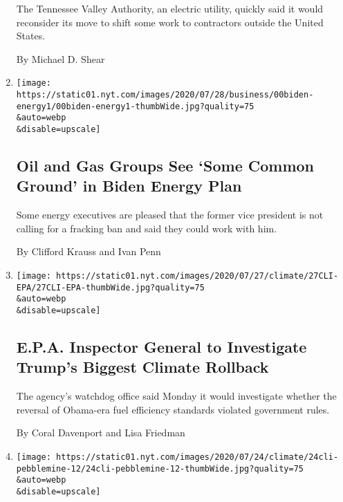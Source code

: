 \begin{enumerate}
  The Tennessee Valley Authority, an electric utility, quickly said it
  would reconsider its move to shift some work to contractors outside
  the United States.

  By Michael D. Shear
\item
  \href{/2020/07/28/business/energy-environment/joe-biden-oil-gas-energy.html}{}

  \texttt{[image: https://static01.nyt.com/images/2020/07/28/business/00biden-energy1/00biden-energy1-thumbWide.jpg?quality=75\\\&auto=webp\\\&disable=upscale]}

  \hypertarget{oil-and-gas-groups-see-some-common-ground-in-biden-energy-plan}{%
  \subsection{Oil and Gas Groups See `Some Common Ground' in Biden
  Energy
  Plan}\label{oil-and-gas-groups-see-some-common-ground-in-biden-energy-plan}}

  Some energy executives are pleased that the former vice president is
  not calling for a fracking ban and said they could work with him.

  By Clifford Krauss and Ivan Penn
\item
  \href{/2020/07/27/climate/trump-fuel-efficiency-rule.html}{}

  \texttt{[image: https://static01.nyt.com/images/2020/07/27/climate/27CLI-EPA/27CLI-EPA-thumbWide.jpg?quality=75\\\&auto=webp\\\&disable=upscale]}

  \hypertarget{epa-inspector-general-to-investigate-trumps-biggest-climate-rollback}{%
  \subsection{E.P.A. Inspector General to Investigate Trump's Biggest
  Climate
  Rollback}\label{epa-inspector-general-to-investigate-trumps-biggest-climate-rollback}}

  The agency's watchdog office said Monday it would investigate whether
  the reversal of Obama-era fuel efficiency standards violated
  government rules.

  By Coral Davenport and Lisa Friedman
\item
  \href{/2020/07/24/climate/pebble-mine-alaska-environment.html}{}

  \texttt{[image: https://static01.nyt.com/images/2020/07/24/climate/24cli-pebblemine-12/24cli-pebblemine-12-thumbWide.jpg?quality=75\\\&auto=webp\\\&disable=upscale]}


\end{enumerate}
